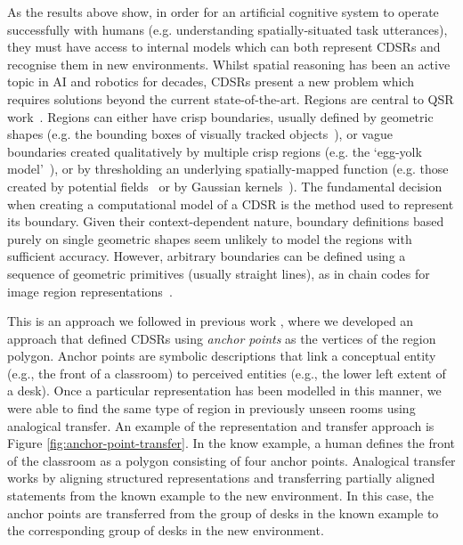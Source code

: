 \documentclass[11pt,letterpaper]{article}
\begin{document}
As the results above show, in order for an artificial cognitive system to operate successfully with humans (e.g. understanding spatially-situated task utterances), they must have access to internal models which can both represent CDSRs and recognise them in new environments. Whilst spatial reasoning has been an active topic in AI and robotics for decades, CDSRs present a new problem which requires solutions beyond the current state-of-the-art. Regions are central to QSR work~\cite{Cohn:2001}. Regions can either have crisp boundaries, usually defined by geometric shapes (e.g. the bounding boxes of visually tracked objects~\cite{SridharCohn:10}), or vague boundaries created qualitatively by multiple crisp regions (e.g. the `egg-yolk model'~\cite{Cohn96b}), or by thresholding an underlying spatially-mapped function (e.g. those created by potential fields~\cite{brenneretal07ijcai} or by Gaussian kernels~\cite{burbridge-dearden12}). The fundamental decision when creating a computational model of a CDSR is the method used to represent its boundary. Given their context-dependent nature, boundary definitions based purely on single geometric shapes seem unlikely to model the regions with sufficient accuracy. However, arbitrary boundaries can be defined using a sequence of geometric primitives (usually straight lines), as in chain codes for image region representations~\cite{Freeman:1961}. 

This is an approach we followed in previous work \cite{Hawes:2012}, where we developed an approach that defined CDSRs using \textit{anchor points} \cite{DBLP:journals/jetai/KlenkFTK11} as the vertices of the region polygon. Anchor points are symbolic descriptions that link a conceptual entity (e.g., the front of a classroom) to perceived entities (e.g., the lower left extent of a desk).  Once a particular representation has been modelled in this manner, we were able to find the same type of region in previously unseen rooms using analogical transfer. An example of the representation and transfer approach is Figure \ref{fig:anchor-point-transfer}.  In the know example, a human defines the front of the classroom as a polygon consisting of four anchor points.  Analogical transfer works by aligning structured representations and transferring partially aligned statements from the known example to the new environment.  In this case, the anchor points are transferred from the group of desks in the known example to the corresponding group of desks in the new environment.
\end{document}
